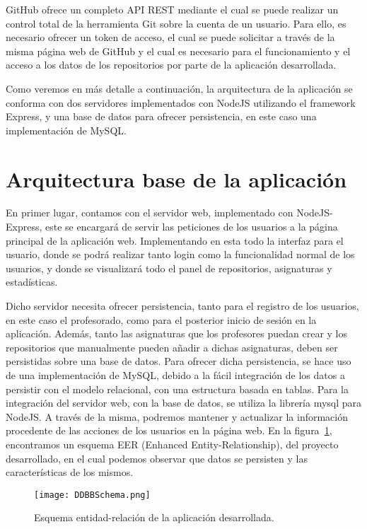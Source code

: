GitHub ofrece un completo API REST mediante el cual se puede realizar un
control total de la herramienta Git sobre la cuenta de un usuario. Para
ello, es necesario ofrecer un token de acceso, el cual se puede solicitar a
través de la misma página web de GitHub y el cual es necesario para el
funcionamiento y el acceso a los datos de los repositorios por parte de la
aplicación desarrollada.

Como veremos en más detalle a continuación, la arquitectura de la
aplicación se conforma con dos servidores implementados con NodeJS
utilizando el framework Express, y una base de datos para ofrecer
persistencia, en este caso una implementación de MySQL.


\section{Arquitectura base de la aplicación}

En primer lugar, contamos con el servidor web, implementado con
NodeJS-Express, este se encargará de servir las peticiones de los usuarios
a la página principal de la aplicación web. Implementando en esta todo la
interfaz para el usuario, donde se podrá realizar tanto login como la
funcionalidad normal de los usuarios, y donde se visualizará todo el panel
de repositorios, asignaturas y estadísticas.

Dicho servidor necesita ofrecer persistencia, tanto para el registro de los
usuarios, en este caso el profesorado, como para el posterior inicio de
sesión en la aplicación. Además, tanto las asignaturas que los profesores
puedan crear y los repositorios que manualmente pueden añadir a dichas
asignaturas, deben ser persistidas sobre una base de datos. Para ofrecer
dicha persistencia, se hace uso de una implementación de MySQL, debido a la
fácil integración de los datos a persistir con el modelo relacional, con
una estructura basada en tablas. Para la integración del servidor web, con
la base de datos, se utiliza la librería mysql para NodeJS. A través de la
misma, podremos mantener y actualizar la información procedente de las
acciones de los usuarios en la página web. En la
figura~\ref{figure:MySQLDraw}, encontramos un esquema EER (Enhanced
Entity-Relationship), del proyecto desarrollado, en el cual podemos
observar que datos se persisten y las características de los mismos.

\begin{figure}[h!]
  \texttt{[image: DDBBSchema.png]}
  \caption{Esquema entidad-relación de la aplicación desarrollada.}
  \label{figure:MySQLDraw}
\end{figure}

